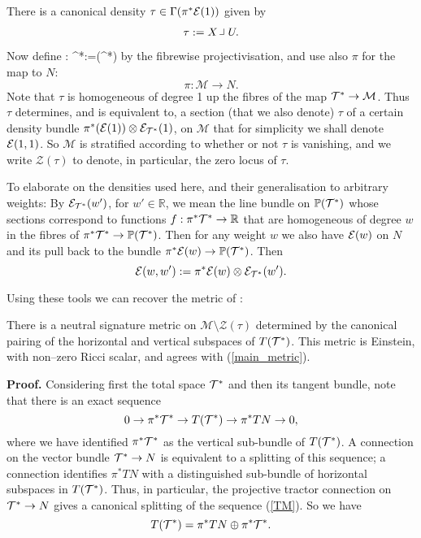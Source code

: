 There is  a canonical density $\tau\in \Gamma(\pi^*\mathcal{E}(1))$ given by
$$
\tau:= X\hook U .
$$


Now define
\be
\label{projection_map}
\kappa: \cT^*\longrightarrow {}:=(\cT^*)
\ee
by the fibrewise
projectivisation, and use also $\pi$ for the map to $N$:
$$
\pi:\mathcal{M}\to N.
$$ Note that $\tau$ is homogeneous of degree 1 up the fibres of the
map $\mathcal{T}^*\to \mathcal{M}$. Thus $\tau$ determines, and is equivalent
to, a section (that we also denote) $\tau$ of a certain density bundle
$\pi^*(\mathcal{E}(1))\otimes \mathcal{E}_{\mathcal{T}^*}(1)$, on $\mathcal{M}$ that for
simplicity we shall denote $\mathcal{E}(1,1)$.  So $\mathcal{M}$ is stratified according to
whether or not $\tau$ is vanishing, and we write $\mathcal{Z}(\tau)$
to denote, in particular, the zero locus of $\tau$.

To elaborate
on the densities used here, and their generalisation to arbitrary
weights: By $\mathcal{E}_{\mathcal{T}^*}(w')$, for $w'\in \mathbb{R}$, we mean the line
bundle on $\mathbb{P}(\mathcal{T}^*)$ whose sections correspond to functions
$f: \pi^*\mathcal{T}^* \to\mathbb{R} $ that are homogeneous of degree $w$ in
the fibres of $\pi^*\mathcal{T}^*\to \mathbb{P}(\mathcal{T}^*)$. Then for any weight $w$ we also have $\mathcal{E}(w)$ on $N$ and its pull back to the bundle $\pi^*\mathcal{E}(w)\to \mathbb{P}(\mathcal{T}^*)$.
Then
$$
\mathcal{E}(w,w'):= \pi^*\mathcal{E}(w) \otimes \mathcal{E}_{\mathcal{T}^*}(w').
$$


Using these tools we can recover the metric of \cite{DM}:
\begin{theo}\label{metric} 
  There is a neutral signature metric on $\mathcal{M}\setminus \mathcal{Z}(\tau)$ determined by the canonical pairing of the horizontal and vertical subspaces
of $T(\mathcal{T}^*)$. This metric is Einstein, with non--zero Ricci scalar, and 
agrees with (\ref{main_metric}).
\end{theo}
{\bf Proof.}
 Considering first the total space $\mathcal{T}^*$ and then its tangent
 bundle, note that there is an exact sequence
  \begin{equation}\label{TM}
0\to \pi^* \mathcal{T}^*\to T(\mathcal{T}^*)\to \pi^*TN\to 0,
  \end{equation}
  where we have identified $\pi^* \mathcal{T}^*$ as the vertical sub-bundle of $T(\mathcal{T}^*)$.
A connection on the vector bundle $\mathcal{T}^*\to N$ is equivalent to a
splitting of this sequence; a connection identifies $\pi^*TN$ with a distinguished  sub-bundle of horizontal subspaces in 
$ T(\mathcal{T}^*)$.
Thus, in particular, the projective tractor
connection on $\mathcal{T}^*\to N$ gives a canonical splitting of the sequence (\ref{TM}).
So we have 
\begin{equation}\label{HV}
T(\mathcal{T}^*)=  \pi^*TN\oplus \pi^* \mathcal{T}^* .
\end{equation}


